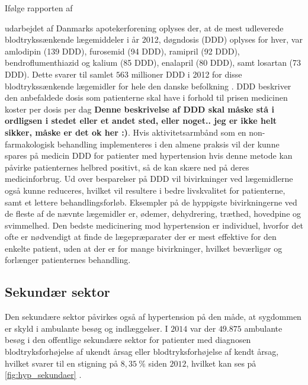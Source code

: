 Ifølge rapporten af \author{apotekerforeningen2012} udarbejdet af Danmarks apotekerforening oplyses der, at de mest udleverede blodtrykssænkende lægemiddeler i år 2012, døgndosis (DDD) oplyses for hver, var amlodipin (139 DDD), furosemid (94 DDD), ramipril (92 DDD), bendroflumenthiazid og kalium (85 DDD), enalapril (80 DDD), samt losartan (73 DDD). Dette svarer til samlet $563$ millioner DDD i 2012 for disse blodtrykssænkende lægemidler for hele den danske befolkning \citep{apotekerforeningen2012}. DDD beskriver den anbefaldede dosis som patienterne skal have i forhold til prisen medicinen koster per dosis per dag \textbf{Denne beskrivelse af DDD skal måske stå i ordligsen i stedet eller et andet sted, eller noget.. jeg er ikke helt sikker, måske er det ok her :)}. Hvis aktivitetsarmbånd som en non-farmakologisk  behandling implementeres i den almene praksis vil der kunne spares på medicin DDD for patienter med hypertension hvis denne metode kan påvirke patienternes helbred positivt, så de kan skære ned på deres medicinforbrug. Ud over besparelser på DDD vil bivirkninger ved lægemidlerne også kunne reduceres, hvilket vil resultere i bedre livskvalitet for patienterne, samt et lettere behandlingsforløb. Eksempler på de hyppigste bivirkningerne ved de fleste af de nævnte lægemidler er, ødemer, dehydrering, træthed, hovedpine og svimmelhed. Den bedste medicinering mod hypertension er individuel, hvorfor det ofte er nødvendigt at finde de lægepræparater der er mest effektive for den enkelte patient, uden at der er for mange bivirkninger, hvilket beværligør og forlænger patienternes behandling.  


\subsection{Sekundær sektor}
Den sekundære sektor påvirkes også af hypertension på den måde, at sygdommen er skyld i ambulante besøg og indlæggelser. I $2014$ var der $49.875$ ambulante besøg i den offentlige sekundære sektor for patienter med diagnosen blodtryksforhøjelse af ukendt årsag eller blodtryksforhøjelse af kendt årsag, hvilket svarer til en stigning på $8,35~\%$ siden $2012$, hvilket kan ses på \autoref{fig:hyp_sekundaer} \citep{sundhedsdatastyrelsen2016}. 

